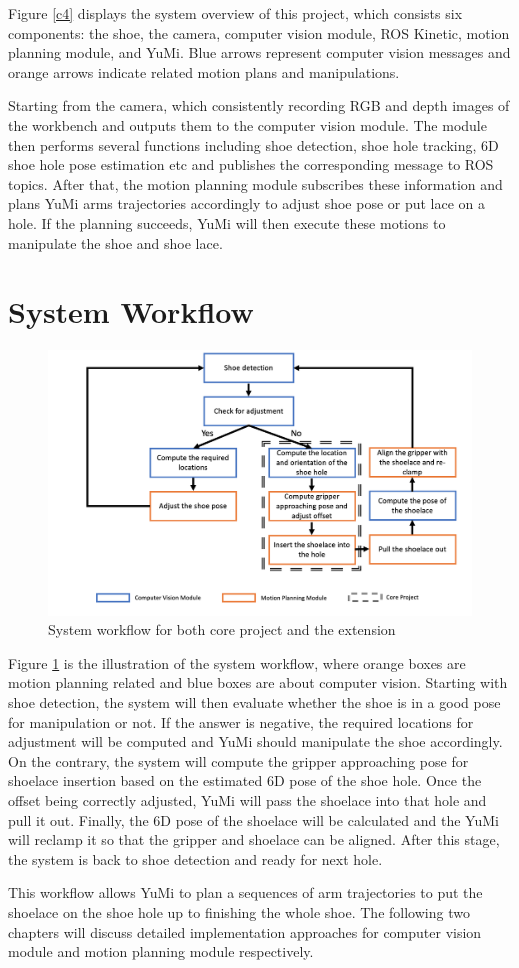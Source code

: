 Figure \ref{c4} displays the system overview of this project, which consists six components: the shoe, the camera, computer vision module, ROS Kinetic, motion planning module, and YuMi. Blue arrows represent computer vision messages and orange arrows indicate related motion plans and manipulations.

Starting from the camera, which consistently recording RGB and depth images of the workbench and outputs them to the computer vision module. The module then performs several functions including shoe detection, shoe hole tracking, 6D shoe hole pose estimation etc and publishes the corresponding message to ROS topics. After that, the motion planning module subscribes these information and plans YuMi arms trajectories accordingly to adjust shoe pose or put lace on a hole. If the planning succeeds, YuMi will then execute these motions to manipulate the shoe and shoe lace.

\section{System Workflow}

\begin{figure}[H]
\centering
\includegraphics[width = \columnwidth]{AnalysisDesign/workflow.png}
\caption{System workflow for both core project and the extension}
\label{workflow}
\end{figure}

Figure \ref{workflow} is the illustration of the system workflow, where orange boxes are motion planning related and blue boxes are about computer vision. Starting with shoe detection, the system will then evaluate whether the shoe is in a good pose for manipulation or not. If the answer is negative, the required locations for adjustment will be computed and YuMi should manipulate the shoe accordingly. On the contrary, the system will compute the gripper approaching pose for shoelace insertion based on the estimated 6D pose of the shoe hole. Once the offset being correctly adjusted, YuMi will pass the shoelace into that hole and pull it out. Finally, the 6D pose of the shoelace will be calculated and the YuMi will reclamp it so that the gripper and shoelace can be aligned. After this stage, the system is back to shoe detection and ready for next hole.

This workflow allows YuMi to plan a sequences of arm trajectories to put the shoelace on the shoe hole up to finishing the whole shoe. The following two chapters will discuss detailed implementation approaches for computer vision module and motion planning module respectively.